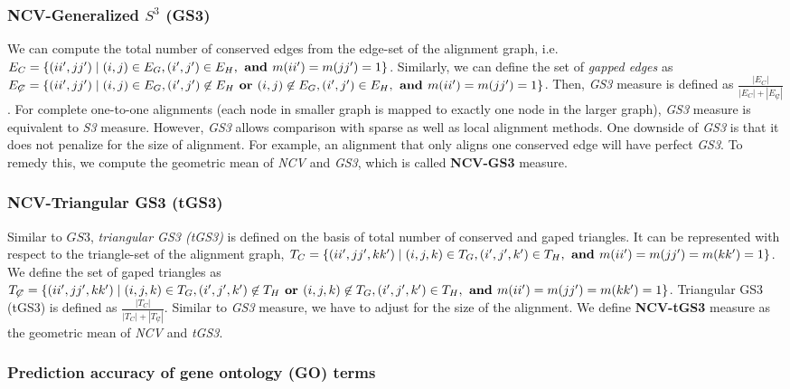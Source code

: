 \documentclass[10pt, journal, compsoc, final]{IEEEtran}
\newcommand{\where}{\mid}
\begin{document}
\subsubsection{NCV-Generalized $S^{3}$ (GS3)} 
We can compute the total number of conserved edges from 
the edge-set of the alignment graph, i.e. $E_C = \{ ( ii', jj') \where (i, j) \in E_G, (i', 
j') \in E_H, \text{\textbf{ and }} m(ii') = m(jj') = 1\}$. Similarly, we can define the set of \textit{gapped edges} as $E_{\not C} = \{ ( ii', jj') \where (i, j) \in E_G, (i', j') \not\in E_H \text{\textbf{ or }} (i, j) \not\in E_G, (i', j') \in E_H , \text{\textbf{ and }} m(ii') = m(jj') = 1\}$. Then, \textit{GS3} measure is defined as $\frac{|E_C|}{|E_C|+|E_\not C|}$. For complete one-to-one alignments (each node in smaller graph is mapped to exactly one node in the larger graph), \textit{GS3} measure is equivalent to \textit{S3} measure. However, \textit{GS3} allows comparison with sparse as well as local alignment methods. One downside of \textit{GS3} is that it does not penalize for the size of alignment. For example, an alignment that only aligns one conserved edge will have perfect \textit{GS3}. To remedy this, we compute the geometric mean of \textit{NCV} and \textit{GS3}, which is called \textbf{NCV-GS3} measure.

\subsubsection{NCV-Triangular GS3 (tGS3)}
Similar to $GS3$, \textit{triangular GS3 (tGS3)} is defined on the basis of total number of 
conserved and gaped triangles. It can be represented with respect to the triangle-set of the alignment graph, 
$T_C = \{ (ii', jj', kk') \where (i, j, k) \in T_G, (i', j', k') \in T_H , \text{\textbf{ and }} m(ii') = m(jj') = m(kk') = 1\}$. We  define the set of gaped triangles as $T_{\not C} = \{ ( ii', jj', kk') \where (i, j, k) \in T_G, (i', j', k') \not\in T_H \text{\textbf{ or }} (i, j, k) \not\in T_G, (i', j', k') \in T_H , \text{\textbf{ and }} m(ii') = m(jj') = m(kk') = 1\}$. Triangular GS3 (tGS3) is defined as $\frac{|T_C|}{|T_C| + |T_{\not C}|}$. Similar to \textit{GS3} measure, we have to adjust for the size of the alignment. We define \textbf{NCV-tGS3} measure as the geometric mean of \textit{NCV} and \textit{tGS3}.



\subsubsection{Prediction accuracy of gene ontology (GO) terms}
\end{document}
